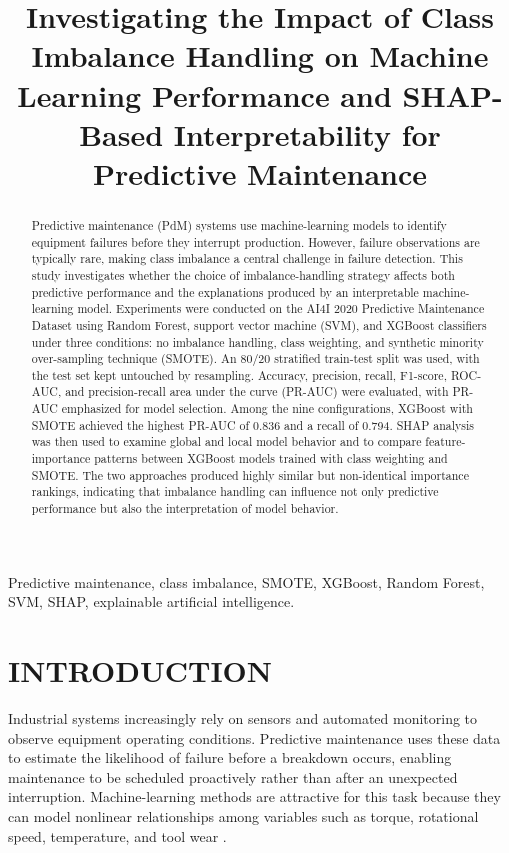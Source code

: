 \documentclass[conference]{IEEEtran}
\title{Investigating the Impact of Class Imbalance Handling on Machine Learning Performance and SHAP-Based Interpretability for Predictive Maintenance}
\author{
\IEEEauthorblockN{Syed Yousaf Shah}
\IEEEauthorblockA{Email: syedyousafshah997@gmail.com}
}
\begin{document}
\maketitle

\begin{abstract}
Predictive maintenance (PdM) systems use machine-learning models to identify equipment failures before they interrupt production. However, failure observations are typically rare, making class imbalance a central challenge in failure detection. This study investigates whether the choice of imbalance-handling strategy affects both predictive performance and the explanations produced by an interpretable machine-learning model. Experiments were conducted on the AI4I 2020 Predictive Maintenance Dataset using Random Forest, support vector machine (SVM), and XGBoost classifiers under three conditions: no imbalance handling, class weighting, and synthetic minority over-sampling technique (SMOTE). An 80/20 stratified train-test split was used, with the test set kept untouched by resampling. Accuracy, precision, recall, F1-score, ROC-AUC, and precision-recall area under the curve (PR-AUC) were evaluated, with PR-AUC emphasized for model selection. Among the nine configurations, XGBoost with SMOTE achieved the highest PR-AUC of 0.836 and a recall of 0.794. SHAP analysis was then used to examine global and local model behavior and to compare feature-importance patterns between XGBoost models trained with class weighting and SMOTE. The two approaches produced highly similar but non-identical importance rankings, indicating that imbalance handling can influence not only predictive performance but also the interpretation of model behavior.
\end{abstract}

\begin{IEEEkeywords}
Predictive maintenance, class imbalance, SMOTE, XGBoost, Random Forest, SVM, SHAP, explainable artificial intelligence.
\end{IEEEkeywords}

\section{INTRODUCTION}

Industrial systems increasingly rely on sensors and automated monitoring to observe equipment operating conditions. Predictive maintenance uses these data to estimate the likelihood of failure before a breakdown occurs, enabling maintenance to be scheduled proactively rather than after an unexpected interruption. Machine-learning methods are attractive for this task because they can model nonlinear relationships among variables such as torque, rotational speed, temperature, and tool wear \cite{matzka2020explainable, zonta2020predictive}.
\end{document}
